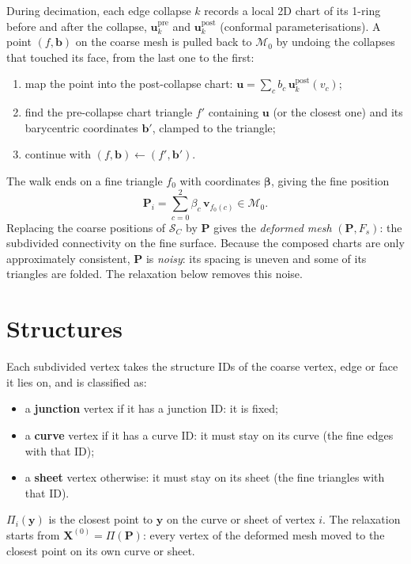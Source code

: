 \documentclass[11pt,a4paper]{article}
\newcommand{\Fine}{\mathcal{M}_0}
\newcommand{\Subdiv}{\mathcal{S}_C}
\newcommand{\Proj}{\Pi}
\newcommand{\X}{\mathbf{X}}
\begin{document}
During decimation, each edge collapse $k$ records a local 2D chart of its 1-ring before and after the collapse, $\mathbf{u}^{\text{pre}}_k$ and $\mathbf{u}^{\text{post}}_k$ (conformal parameterisations). A point $(f, \mathbf{b})$ on the coarse mesh is pulled back to $\Fine$ by undoing the collapses that touched its face, from the last one to the first:
\begin{enumerate}
    \item map the point into the post-collapse chart: $\mathbf{u} = \sum_{c} b_c \, \mathbf{u}^{\text{post}}_k(v_c)$;
    \item find the pre-collapse chart triangle $f'$ containing $\mathbf{u}$ (or the closest one) and its barycentric coordinates $\mathbf{b}'$, clamped to the triangle;
    \item continue with $(f, \mathbf{b}) \leftarrow (f', \mathbf{b}')$.
\end{enumerate}
The walk ends on a fine triangle $f_0$ with coordinates $\boldsymbol{\beta}$, giving the fine position
\begin{equation}
    \mathbf{P}_i = \sum_{c=0}^{2} \beta_c \, \mathbf{v}_{f_0(c)} \in \Fine .
\end{equation}
Replacing the coarse positions of $\Subdiv$ by $\mathbf{P}$ gives the \emph{deformed mesh} $(\mathbf{P}, F_s)$: the subdivided connectivity on the fine surface. Because the composed charts are only approximately consistent, $\mathbf{P}$ is \emph{noisy}: its spacing is uneven and some of its triangles are folded. The relaxation below removes this noise.

\section{Structures}

Each subdivided vertex takes the structure IDs of the coarse vertex, edge or face it lies on, and is classified as:
\begin{itemize}
    \item a \textbf{junction} vertex if it has a junction ID: it is fixed;
    \item a \textbf{curve} vertex if it has a curve ID: it must stay on its curve (the fine edges with that ID);
    \item a \textbf{sheet} vertex otherwise: it must stay on its sheet (the fine triangles with that ID).
\end{itemize}
$\Proj_i(\mathbf{y})$ is the closest point to $\mathbf{y}$ on the curve or sheet of vertex $i$. The relaxation starts from $\X^{(0)} = \Proj(\mathbf{P})$: every vertex of the deformed mesh moved to the closest point on its own curve or sheet.
\end{document}
